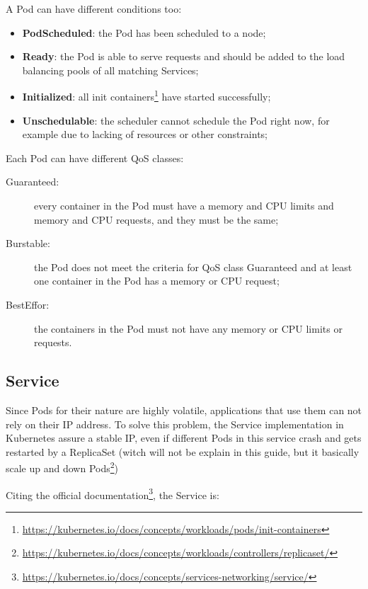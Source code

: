 A Pod can have different conditions too:
\begin{itemize}
\item \textbf{PodScheduled}: the Pod has been scheduled to a node;
\item \textbf{Ready}: the Pod is able to serve requests and should be added
  to the load balancing pools of all matching Services;
\item \textbf{Initialized}: all init containers\footnote{
  \url{https://kubernetes.io/docs/concepts/workloads/pods/init-containers}}
  have started successfully;
\item \textbf{Unschedulable}: the scheduler cannot schedule the Pod right
  now, for example due to lacking of resources or other constraints;
\end{itemize}

Each Pod can have different QoS classes:
\begin{description}
  \item [Guaranteed:] every container in the Pod must have a memory and CPU
  limits and memory and CPU requests, and they must be the same;
  \item [Burstable:] the Pod does not meet the criteria for QoS class
  Guaranteed and at least one container in the Pod has a memory or CPU request;
  \item [BestEffor:] the containers in the Pod must not have any memory or CPU
  limits or requests.
\end{description}

\subsection{Service}
\label{service}

Since Pods for their nature are highly volatile, applications that use
them can not rely on their IP address. To solve this problem, the
Service implementation in Kubernetes assure a stable IP, even if
different Pods in this service crash and gets restarted by a ReplicaSet
(witch will not be explain in this guide, but it basically scale up and
down Pods\footnote{
\url{https://kubernetes.io/docs/concepts/workloads/controllers/replicaset/}})

Citing the official documentation\footnote{
\url{https://kubernetes.io/docs/concepts/services-networking/service/}}, the
Service is:\\

